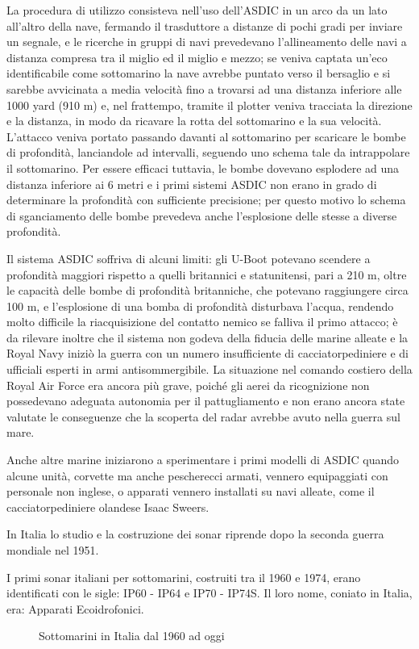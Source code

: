 La procedura di utilizzo consisteva nell'uso dell'ASDIC in un arco da un lato all'altro della nave, fermando il trasduttore a distanze di pochi gradi per inviare un segnale, e le ricerche in gruppi di navi prevedevano l'allineamento delle navi a distanza compresa tra il miglio ed il miglio e mezzo; se veniva captata un'eco identificabile come sottomarino la nave avrebbe puntato verso il bersaglio e si sarebbe avvicinata a media velocità fino a trovarsi ad una distanza inferiore alle 1000 yard (910 m) e, nel frattempo, tramite il plotter veniva tracciata la direzione e la distanza, in modo da ricavare la rotta del sottomarino e la sua velocità. L'attacco veniva portato passando davanti al sottomarino per scaricare le bombe di profondità, lanciandole ad intervalli, seguendo uno schema tale da intrappolare il sottomarino. Per essere efficaci tuttavia, le bombe dovevano esplodere ad una distanza inferiore ai 6 metri e i primi sistemi ASDIC non erano in grado di determinare la profondità con sufficiente precisione; per questo motivo lo schema di sganciamento delle bombe prevedeva anche l'esplosione delle stesse a diverse profondità.

Il sistema ASDIC soffriva di alcuni limiti: 
gli U-Boot potevano scendere a profondità maggiori rispetto a quelli britannici e statunitensi, pari a 210 m, oltre le capacità delle bombe di profondità britanniche, che potevano raggiungere circa 100 m, e l'esplosione di una bomba di profondità disturbava l'acqua, rendendo molto difficile la riacquisizione del contatto nemico se falliva il primo attacco; è da rilevare inoltre che il sistema non godeva della fiducia delle marine alleate e la Royal Navy iniziò la guerra con un numero insufficiente di cacciatorpediniere e di ufficiali esperti in armi antisommergibile. La situazione nel comando costiero della Royal Air Force era ancora più grave, poiché gli aerei da ricognizione non possedevano adeguata autonomia per il pattugliamento e non erano ancora state valutate le conseguenze che la scoperta del radar avrebbe avuto nella guerra sul mare.

Anche altre marine iniziarono a sperimentare i primi modelli di ASDIC quando alcune unità, corvette ma anche pescherecci armati, vennero equipaggiati con personale non inglese, o apparati vennero installati su navi alleate, come il cacciatorpediniere olandese Isaac Sweers.

In Italia lo studio e la costruzione dei sonar riprende dopo la seconda guerra mondiale nel 1951.

I primi sonar italiani per sottomarini, costruiti tra il 1960 e 1974, erano identificati con le sigle: IP60 - IP64 e IP70 - IP74S. Il loro nome, coniato in Italia, era: Apparati Ecoidrofonici.
\begin{figure}
\centering 
{} \quad
{} \quad
{} \quad
\caption [Sottomarini in italia dal 1960 ad oggi]{Sottomarini in Italia dal 1960 ad oggi}
\end{figure}

